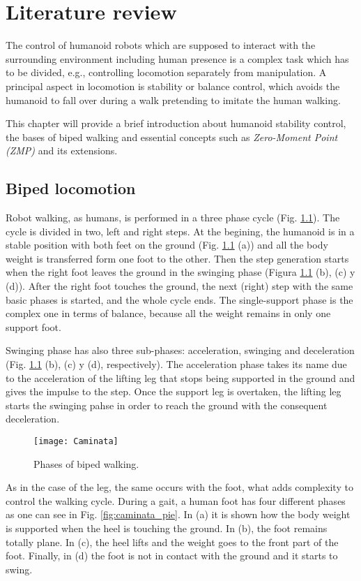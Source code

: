 \chapter{Literature review}
The control of humanoid robots which are supposed to interact with the surrounding environment including human presence is a complex task which has to be divided, e.g., controlling locomotion separately from manipulation. A principal aspect in locomotion is stability or balance control, which avoids the humanoid to fall over during a walk pretending to imitate the human walking.

This chapter will provide a brief introduction about humanoid stability control, the bases of biped walking and essential concepts such as \textit{Zero-Moment Point (ZMP)} and its extensions. 

\section{Biped locomotion}
Robot walking, as humans, is performed in a three phase cycle (Fig. \ref{fig:caminata}). The cycle is divided in two, left and right steps. At the begining, the humanoid is in a stable position with both feet on the ground (Fig. \ref{fig:caminata} (a)) and all the body weight is transferred form one foot to the other. Then the step generation starts when the right foot leaves the ground in the swinging phase (Figura \ref{fig:caminata} (b), (c) y (d)). After the right foot touches the ground, the next (right) step with the same basic phases is started, and the whole cycle ends. The single-support phase is the complex one in terms of balance, because all the weight remains in only one support foot.

Swinging phase has also three sub-phases: acceleration, swinging and deceleration (Fig. \ref{fig:caminata} (b), (c) y (d), respectively). The acceleration phase takes its name due to the acceleration of the lifting leg that stops being supported in the ground and gives the impulse to the step. Once the support leg is overtaken, the lifting leg starts the swinging pahse in order to reach the ground with the consequent deceleration.

\begin{figure}[!hbt]
\centering
\texttt{[image: Caminata]}
\caption{Phases of biped walking.}
\label{fig:caminata}
\end{figure}

As in the case of the leg, the same occurs with the foot, what adds complexity to control the walking cycle. During a gait, a human foot has four different phases as one can see in Fig. \ref{fig:caminata_pie}. In (a) it is shown how the body weight is supported when the heel is touching the ground. In (b), the foot remains totally plane. In (c), the heel lifts and the weight goes to the front part of the foot. Finally, in (d) the foot is not in contact with the ground and it starts to swing.


